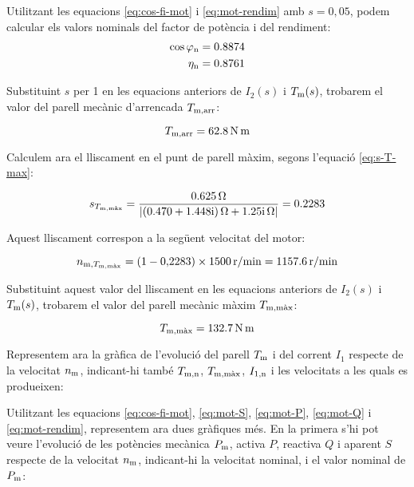 \begin{exemple}
    Utilitzant les equacions  \eqref{eq:cos-fi-mot} i \eqref{eq:mot-rendim} amb $s  = 0{,}05$, podem calcular els valors nominals del factor de potència i del rendiment:
    \begin{align*}
    	\cos\varphi_\mathrm{n} &= \num{0,8874} \\
    	\eta_\mathrm{n} &=  \num{0,8761}
    \end{align*}
    
    Substituint $s$ per 1   en les equacions anteriors de $I_2(s)$  i $T_\mathrm{m}(s)$, trobarem el valor del parell mecànic d'arrencada $T_\mathrm{m,arr}$:
    
	\[
		T_\mathrm{m,arr} = \qty{62,8}{N.m}
	\]

    Calculem ara el lliscament en el punt de parell màxim, segons l'equació \eqref{eq:s-T-max}:
    
    \[
        s_{T\ped{m,\text{màx}}} =  \frac{\qty{0,625}{\ohm}}{|\complexqty{0,470+j1,448}{\ohm} + \complexqty{j1,25}{\ohm}|} = \num{0,2283} 
    \]
    
    Aquest lliscament correspon a la següent  velocitat del motor:
    
    \[
    	n_{\text{m},T_\mathrm{m,\text{màx}}} = (1 - 0{,}2283) \times \qty{1500}{r/min} = \qty{1157,6}{r/min}
    \]
    
  Substituint aquest valor del lliscament en les equacions anteriors de $I_2(s)$  i $T_\mathrm{m}(s)$, trobarem el valor del parell mecànic màxim  $T_\mathrm{m,\text{màx}}$:
  
  \[
 	T_\mathrm{m,\text{màx}} = \qty{132,7}{N.m}
  \]


    Representem ara la gràfica de l'evolució del parell $T_\mathrm{m}$ i del corrent $I_1$ respecte de la velocitat $n_\mathrm{m}$, indicant-hi també $T_\mathrm{m,n}$, $T_\mathrm{m,\text{màx}}$, $I_\mathrm{1,n}$ i les velocitats a les quals es produeixen:
    \begin{center}
        \fontsize{10pt}{11pt}\selectfont
        
    \end{center}
	\vspace{-2mm}
	Utilitzant les equacions \eqref{eq:cos-fi-mot}, \eqref{eq:mot-S}, \eqref{eq:mot-P}, \eqref{eq:mot-Q} i \eqref{eq:mot-rendim}, representem ara dues gràfiques més. 	  En la primera s'hi pot veure  l'evolució de les potències mecànica $P_\mathrm{m}$, activa  $P$, reactiva $Q$ i aparent $S$ respecte de la velocitat $n_\mathrm{m}$, indicant-hi  la   velocitat nominal, i el valor nominal de $P_\mathrm{m}$:
	\begin{center}
		\fontsize{10pt}{11pt}\selectfont
		
	\end{center}	
	

\end{exemple}
